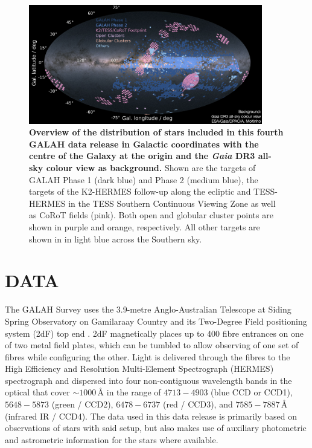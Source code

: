 \documentclass[
  journal=pasa,
  manuscript=research-paper, %
  year=2024,
  volume=37
]{cup-journal}
\newcommand{\Gaia}{\textit{Gaia}\xspace}
\begin{document}
\begin{figure}[ht]
 \centering
 \includegraphics[width=0.91\textwidth]{figures/galah_dr4_skymap_gaiadr3.png}
 \caption{\textbf{Overview of the distribution of stars included in this fourth GALAH data release in Galactic coordinates with the centre of the Galaxy at the origin and the \Gaia DR3 all-sky colour view \citep{GaiaDR3} as background.}
Shown are the targets of GALAH Phase 1 (dark blue) and Phase 2 (medium blue), the targets of the K2-HERMES follow-up along the ecliptic and TESS-HERMES in the TESS Southern Continuous Viewing Zone as well as CoRoT fields (pink). Both open and globular cluster points are shown in purple and orange, respectively. All other targets are shown in in light blue across the Southern sky.
}
 \label{fig:galah_dr4_skymap_gaiadr3}
\end{figure}

\section{DATA}
\label{sec:data}

The GALAH Survey uses the 3.9-metre Anglo-Australian Telescope at Siding Spring Observatory on Gamilaraay Country and its Two-Degree Field positioning system (2dF) top end \citep{Lewis2002}. 2dF magnetically places up to 400 fibre entrances on one of two metal field plates, which can be tumbled to allow observing of one set of fibres while configuring the other. Light is delivered through the fibres to the High Efficiency and Resolution Multi-Element Spectrograph (HERMES) spectrograph \citep{Barden2010, Brzeski2011, Heijmans2012, Farrell2014, Sheinis2015} and dispersed into four non-contiguous wavelength bands in the optical that cover $\sim 1000\,\text{\AA}$ in the range of $4713-4903$ (blue CCD or CCD1), $5648-5873$ (green / CCD2), $6478-6737$ (red / CCD3), and $7585-7887\,\text{\AA}$ (infrared IR / CCD4). The data used in this data release is primarily based on observations of stars with said setup, but also makes use of auxiliary photometric and astrometric information for the stars where available.
\end{document}
